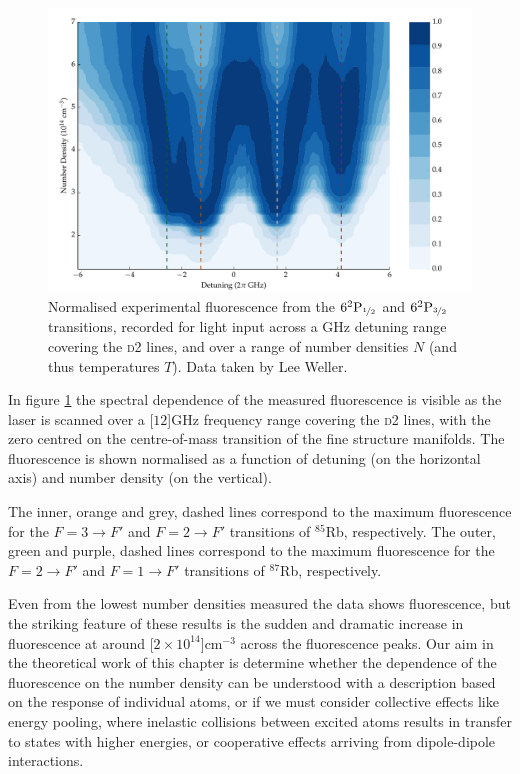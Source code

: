     \begin{figure}[]
    \includegraphics[width=\linewidth]
      {figs/05_twophoton/plot_blue_flourescence_fig1.pdf}
    \caption{
    Normalised experimental fluorescence from the
    $6^2\mathrm{P}_{\nicefrac{1}{2}}$ and $6^2\mathrm{P}_{\nicefrac{3}{2}}$
    transitions, recorded for light input across a GHz detuning range covering
    the \textsc{d2} lines, and over a range of number densities $N$ (and thus
    temperatures $T$). Data taken by Lee Weller\cite{Weller2013}.
    } 
    \label{fig:blue_flourescence} 
    \end{figure}

    In figure \ref{fig:blue_flourescence} the spectral dependence of the
    measured fluorescence is visible as the laser is scanned over a
    \unit[$12$]{GHz} frequency range covering the \textsc{d2} lines, with the
    zero centred on the centre-of-mass transition of the fine structure
    manifolds. The fluorescence is shown normalised as a function of detuning
    (on the horizontal axis) and number density (on the vertical).

    The inner, orange and grey, dashed lines correspond to the maximum
    fluorescence for the $F = 3 \rightarrow F'$ and $F = 2 \rightarrow F'$
    transitions of $^{85}$Rb, respectively. The outer, green and purple, dashed
    lines correspond to the maximum fluorescence for the $F = 2 \rightarrow F'$
    and $F = 1 \rightarrow F'$ transitions of $^{87}$Rb, respectively.

    Even from the lowest number densities measured the data shows fluorescence,
    but the striking feature of these results is the sudden and dramatic
    increase in fluorescence at around \unit[$2\times10^{14}$]{cm$^{-3}$} across
    the fluorescence peaks. Our aim in the theoretical work of this chapter is
    determine whether the dependence of the fluorescence on the number density
    can be understood with a description based on the response of individual
    atoms, or if we must consider collective effects like energy
    pooling\cite{Bearman1978,Hill1979,Namiotka1997}, where inelastic collisions
    between excited atoms results in transfer to states with higher energies, or
    cooperative effects arriving from dipole-dipole
    interactions\cite{Keaveney2012a,Weller2011}.
